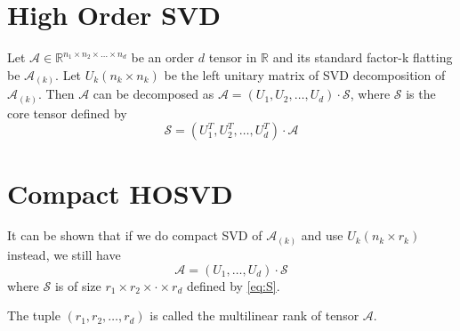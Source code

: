 \documentclass{article}
\def\R{\mathbb{R}}
\begin{document}
\section{High Order SVD}
Let $\mathcal{A} \in \R^{n_1 \times n_2 \times \dots \times n_d}$ be an order $d$ tensor in $\R$ and its standard factor-k flatting be $\mathcal{A}_{(k)}$. Let $U_k (n_k \times n_k)$ be the left unitary matrix of SVD decomposition of $\mathcal{A}_{(k)}$. Then  $\mathcal{A}$
can be decomposed as $ \mathcal{A} = (U_1, U_2, \dots, U_d) \cdot \mathcal{S}$, where $\mathcal{S}$ is the core tensor defined by
\begin{equation}\label{eq:S}
 \mathcal{S} = (U_1^T, U_2^T, \dots, U_d^T) \cdot \mathcal{A}
\end{equation} 

\section{Compact HOSVD}
It can be shown that if we do compact SVD of $\mathcal{A}_{(k)}$ and use $U_k(n_k \times r_k)$ instead, we still have 
\begin{equation}
\mathcal{A} = (U_1, \dots, U_d) \cdot \mathcal{S}
\end{equation}
where $\mathcal{S}$ is of size $r_1 \times r_2\times \cdot \times r_d$ defined by \eqref{eq:S}. 

The tuple $(r_1, r_2, \dots, r_d) $ is called the multilinear rank of tensor $\mathcal{A}$.
\end{document}
